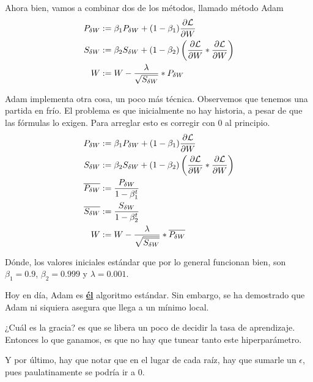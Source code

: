 Ahora bien, vamos a combinar dos de los métodos, llamado método Adam
\begin{align*}
   P_{\delta W} &:= \beta_1 P_{\delta W} + (1 - \beta_1) \frac{\partial \mathcal{L}}{\partial W} \\
   S_{\delta W} &:= \beta_2 S_{\delta W} + (1 - \beta_2) \left( \frac{\partial \mathcal{L}}{\partial W} \ast \frac{\partial \mathcal{L}}{\partial W} \right) \\
   W &:= W - \frac{\lambda}{\sqrt{S_{\delta W}}} \ast P_{\delta W}
\end{align*}

Adam implementa otra cosa, un poco más técnica. Observemos que tenemos una partida en frío. El problema es que inicialmente no hay historia, a pesar de que las fórmulas lo exigen. Para arreglar esto es corregir con 0 al principio.
\begin{align*}
   P_{\delta W} &:= \beta_1 P_{\delta W} + (1 - \beta_1) \frac{\partial \mathcal{L}}{\partial W} \\
   S_{\delta W} &:= \beta_2 S_{\delta W} + (1 - \beta_2) \left( \frac{\partial \mathcal{L}}{\partial W} \ast \frac{\partial \mathcal{L}}{\partial W} \right) \\
   \overline{P_{\delta W}} &:= \frac{P_{\delta W}}{1 - \beta_1^t} \\
   \overline{S_{\delta W}} &:= \frac{S_{\delta W}}{1 - \beta_2^t}\\
   W &:= W - \frac{\lambda}{\sqrt{\overline{S_{\delta W}}}} \ast \overline{P_{\delta W}}
\end{align*}

Dónde, los valores iniciales estándar que por lo general funcionan bien, son $\beta_1 = 0.9$, $\beta_2 = 0.999$ y $\lambda = 0.001$.

Hoy en día, Adam es \textbf{\underline{él}} algoritmo estándar. Sin embargo, se ha demostrado que Adam ni siquiera asegura que llega a un mínimo local.

¿Cuál es la gracia? es que se libera un poco de decidir la tasa de aprendizaje. Entonces lo que ganamos, es que no hay que tunear tanto este hiperparámetro.

Y por último, hay que notar que en el lugar de cada raíz, hay que sumarle un $\epsilon$, pues paulatinamente se podría ir a 0.

